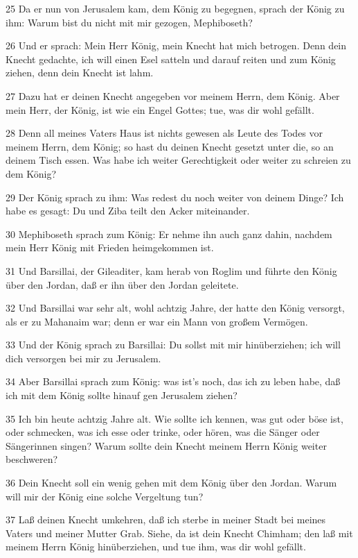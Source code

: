 \par 25 Da er nun von Jerusalem kam, dem König zu begegnen, sprach der König zu ihm: Warum bist du nicht mit mir gezogen, Mephiboseth?
\par 26 Und er sprach: Mein Herr König, mein Knecht hat mich betrogen. Denn dein Knecht gedachte, ich will einen Esel satteln und darauf reiten und zum König ziehen, denn dein Knecht ist lahm.
\par 27 Dazu hat er deinen Knecht angegeben vor meinem Herrn, dem König. Aber mein Herr, der König, ist wie ein Engel Gottes; tue, was dir wohl gefällt.
\par 28 Denn all meines Vaters Haus ist nichts gewesen als Leute des Todes vor meinem Herrn, dem König; so hast du deinen Knecht gesetzt unter die, so an deinem Tisch essen. Was habe ich weiter Gerechtigkeit oder weiter zu schreien zu dem König?
\par 29 Der König sprach zu ihm: Was redest du noch weiter von deinem Dinge? Ich habe es gesagt: Du und Ziba teilt den Acker miteinander.
\par 30 Mephiboseth sprach zum König: Er nehme ihn auch ganz dahin, nachdem mein Herr König mit Frieden heimgekommen ist.
\par 31 Und Barsillai, der Gileaditer, kam herab von Roglim und führte den König über den Jordan, daß er ihn über den Jordan geleitete.
\par 32 Und Barsillai war sehr alt, wohl achtzig Jahre, der hatte den König versorgt, als er zu Mahanaim war; denn er war ein Mann von großem Vermögen.
\par 33 Und der König sprach zu Barsillai: Du sollst mit mir hinüberziehen; ich will dich versorgen bei mir zu Jerusalem.
\par 34 Aber Barsillai sprach zum König: was ist's noch, das ich zu leben habe, daß ich mit dem König sollte hinauf gen Jerusalem ziehen?
\par 35 Ich bin heute achtzig Jahre alt. Wie sollte ich kennen, was gut oder böse ist, oder schmecken, was ich esse oder trinke, oder hören, was die Sänger oder Sängerinnen singen? Warum sollte dein Knecht meinem Herrn König weiter beschweren?
\par 36 Dein Knecht soll ein wenig gehen mit dem König über den Jordan. Warum will mir der König eine solche Vergeltung tun?
\par 37 Laß deinen Knecht umkehren, daß ich sterbe in meiner Stadt bei meines Vaters und meiner Mutter Grab. Siehe, da ist dein Knecht Chimham; den laß mit meinem Herrn König hinüberziehen, und tue ihm, was dir wohl gefällt.
